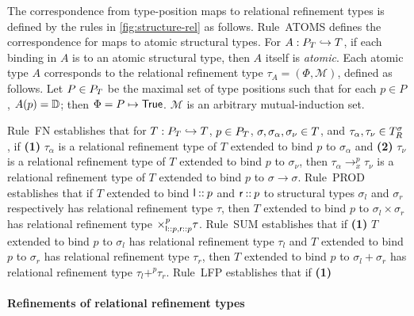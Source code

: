 The correspondence from type-position maps to relational refinement
types is defined by the rules in \autoref{fig:structure-rel} as
follows.
%
Rule~ATOMS defines the correspondence for maps to atomic structural
types.
For $A : P_T \hookrightarrow T$, if each binding in $A$ is to an
atomic structural type, then $A$ itself is \emph{atomic}.
Each atomic type $A$ corresponds to the relational refinement type
$\tau_A = (\Phi, \mathcal{M})$, defined as follows.
Let $P \in P_T$ be the maximal set of type positions such that for
each $p \in P$, $A(p) = \mathbb{D}$;
%
then $\Phi = P \mapsto \mathsf{True}$.
%
$\mathcal{M}$ is an arbitrary mutual-induction set.
%

Rule~FN establishes that for $T : P_T \hookrightarrow T$,
$p \in P_T$, $\sigma, \sigma_{\alpha}, \sigma_{\nu} \in T$,
and $\tau_{\alpha}, \tau_{\nu} \in T_{R}^{ \sigma }$, if %
\textbf{(1)} $\tau_{\alpha}$ is a relational refinement type of $T$
extended to bind $p$ to $\sigma_{\alpha}$ and %
\textbf{(2)} $\tau_{\nu}$ is a relational refinement type of $T$
extended to bind $p$ to $\sigma_{\nu}$, then
$\tau_{\alpha} \to_{x}^p \tau_{\nu}$ is a relational refinement type
of $T$ extended to bind $p$ to $\sigma \to \sigma$.
Rule~PROD establishes that if $T$ extended to bind
$\mathsf{l} \mathbin{::} p$ and $\mathsf{r} \mathbin{::} p$ to structural types
$\sigma_l$ and $\sigma_r$ respectively has relational refinement type
$\tau$, then $T$ extended to bind $p$ to $\sigma_l \times \sigma_r$
has relational refinement type
$\times_{ \mathsf{l} \mathbin{::} p, \mathsf{r} \mathbin{::} p}^{p} \tau$.
Rule~SUM establishes that if %
\textbf{(1)} $T$ extended to bind $p$ to $\sigma_l$ has relational
refinement type $\tau_l$ and $T$ extended to bind $p$ to $\sigma_r$
has relational refinement type $\tau_r$, then $T$ extended to bind $p$
to $\sigma_l + \sigma_r$ has relational refinement type
$\tau_l +^{p} \tau_r$.
%
Rule~LFP establishes that if %
\textbf{(1)}


\paragraph{Refinements of relational refinement types}

